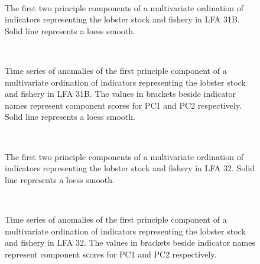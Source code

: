 \documentclass[11pt]{article}
\newcommand{\D}{.}
\newcommand{\e}{/backup/bio_data/bio.lobster/figures/} %
\begin{document}

\begin{figure}
\centering
   \\
                     \caption{The first two principle components of a multivariate ordination of indicators representing the lobster stock and fishery in LFA 31B. Solid line represents a loess smooth.}
\end{figure}
\clearpage

\begin{figure}

   \\
                     \caption{Time series of anomalies of the first principle component of a multivariate ordination of indicators representing the lobster stock and fishery in LFA 31B. The values in brackets beside indicator names represent component scores for PC1 and PC2 respectively. Solid line represents a loess smooth.}
\end{figure}


\begin{figure}
\centering
   \\
                     \caption{The first two principle components of a multivariate ordination of indicators representing the lobster stock and fishery in LFA 32. Solid line represents a loess smooth.}
\end{figure}
\clearpage

\begin{figure}

   \\
                     \caption{Time series of anomalies of the first principle component of a multivariate ordination of indicators representing the lobster stock and fishery in LFA 32. The values in brackets beside indicator names represent component scores for PC1 and PC2 respectively.}
\end{figure}
\end{document}
